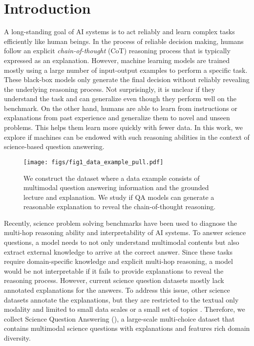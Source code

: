 

\section{Introduction}
\label{sec:intro}
A long-standing goal of AI systems is to act reliably and learn complex tasks efficiently like human beings. 
In the process of reliable decision making, humans follow an explicit \textit{chain-of-thought} (CoT) reasoning process that is typically expressed as an explanation. 
However, machine learning models are trained mostly using a large number of input-output examples to perform a specific task. 
These black-box models only generate the final decision without reliably revealing the underlying reasoning process. 
Not surprisingly, it is unclear if they understand the task and can generalize even though they perform well on the benchmark. 
On the other hand, humans are able to learn from instructions or explanations from past experience and generalize them to novel and unseen problems. 
This helps them learn more quickly with fewer data. In this work, we explore if machines can be endowed with such reasoning abilities in the context of science-based question answering. 

\begin{figure}[th!]
 \centering
\texttt{[image: figs/fig1\_data\_example\_pull.pdf]}
 \caption{We construct the \name{} dataset where a data example consists of multimodal question answering information and the grounded lecture and explanation. We study if QA models can generate a reasonable explanation to reveal the chain-of-thought reasoning.}
\label{fig:example}
\end{figure}

Recently, science problem solving benchmarks \cite{kembhavi2017you} have been used to diagnose the multi-hop reasoning ability and interpretability of AI systems. To answer science questions, a model needs to not only understand multimodal contents but also extract external knowledge to arrive at the correct answer. Since these tasks require domain-specific knowledge and explicit multi-hop reasoning, a model would be not interpretable if it fails to provide explanations to reveal the reasoning process. However, current science question datasets \cite{kembhavi2017you,kembhavi2016diagram,sampat2020visuo} mostly lack annotated explanations for the answers. To address this issue, other science datasets annotate the explanations, but they are restricted to the textual only modality and limited to small data scales \cite{jansen2018worldtree,dalvi2021explaining,mihaylov2018can} or a small set of topics \cite{Khot2020QASCAD,jhamtani2020learning}. Therefore, we collect Science Question Answering (\name{}), a large-scale multi-choice dataset that contains multimodal science questions with explanations and features rich domain diversity.

